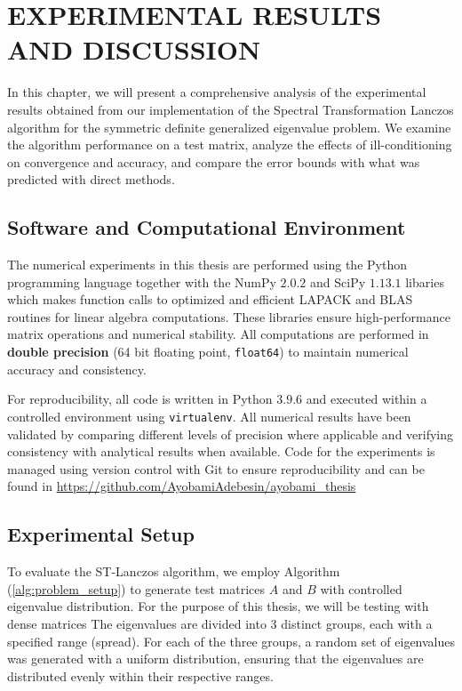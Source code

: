 \chapter{EXPERIMENTAL RESULTS AND DISCUSSION}

In this chapter, we will present a comprehensive analysis of the experimental results obtained from our implementation of the Spectral Transformation Lanczos algorithm for the symmetric definite generalized eigenvalue problem. We examine the algorithm performance on a test matrix, analyze the effects of ill-conditioning on convergence and accuracy, and compare the error bounds with what was predicted with direct methods.

\section{Software and Computational Environment}
The numerical experiments in this thesis are performed using the Python programming language together with the NumPy $2.0.2$ and SciPy $1.13.1$ libaries which makes function calls to optimized and efficient LAPACK and BLAS routines for linear algebra computations. These libraries ensure high-performance matrix operations and numerical stability. All computations are performed in \textbf{double precision} (64 bit floating point, \texttt{float64}) to maintain numerical accuracy and consistency.

For reproducibility, all code is written in Python $3.9.6$ and executed within a controlled environment using \texttt{virtualenv}. All numerical results have been validated by comparing different levels of precision where applicable and verifying consistency with analytical results when available. Code for the experiments is managed using version control with Git to ensure reproducibility and can be found in \href{https://github.com/AyobamiAdebesin/ayobami_thesis}{https://github.com/AyobamiAdebesin/ayobami\_thesis}

\section{Experimental Setup}
To evaluate the ST-Lanczos algorithm, we employ Algorithm (\ref{alg:problem_setup}) to generate test matrices $A$ and $B$ with controlled eigenvalue distribution. For the purpose of this thesis, we will be testing with dense matrices The eigenvalues are divided into 3 distinct groups, each with a specified range (spread). For each of the three groups, a random set of eigenvalues was generated with a uniform distribution, ensuring that the eigenvalues are distributed evenly within their respective ranges.

